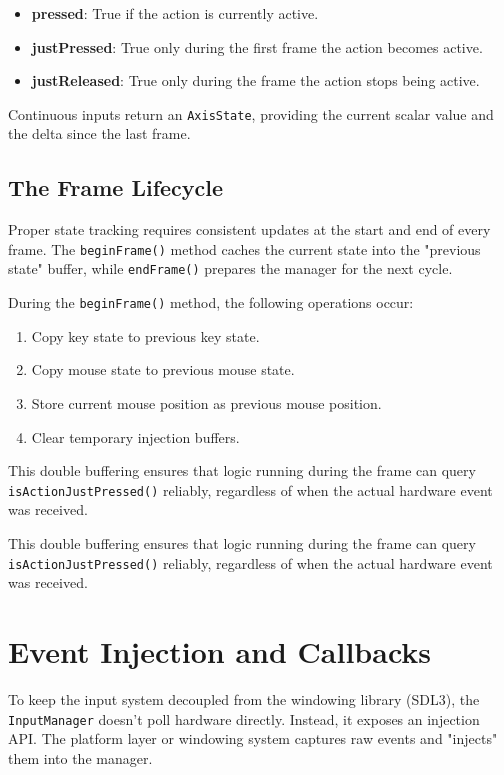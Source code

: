 \begin{itemize}
    \item \textbf{pressed}: True if the action is currently active.
    \item \textbf{justPressed}: True only during the first frame the action becomes active.
    \item \textbf{justReleased}: True only during the frame the action stops being active.
\end{itemize}

Continuous inputs return an \texttt{AxisState}, providing the current scalar value and the delta since the last frame.

\subsection{The Frame Lifecycle}

Proper state tracking requires consistent updates at the start and end of every frame. The \texttt{beginFrame()} method caches the current state into the "previous state" buffer, while \texttt{endFrame()} prepares the manager for the next cycle.

During the \texttt{beginFrame()} method, the following operations occur:
\begin{enumerate}
    \item Copy key state to previous key state.
    \item Copy mouse state to previous mouse state.
    \item Store current mouse position as previous mouse position.
    \item Clear temporary injection buffers.
\end{enumerate}

This double buffering ensures that logic running during the frame can query \texttt{isActionJustPressed()} reliably, regardless of when the actual hardware event was received.

This double buffering ensures that logic running during the frame can query \texttt{isActionJustPressed()} reliably, regardless of when the actual hardware event was received.

\section{Event Injection and Callbacks}

To keep the input system decoupled from the windowing library (SDL3), the \texttt{InputManager} doesn't poll hardware directly. Instead, it exposes an injection API. The platform layer or windowing system captures raw events and "injects" them into the manager.

